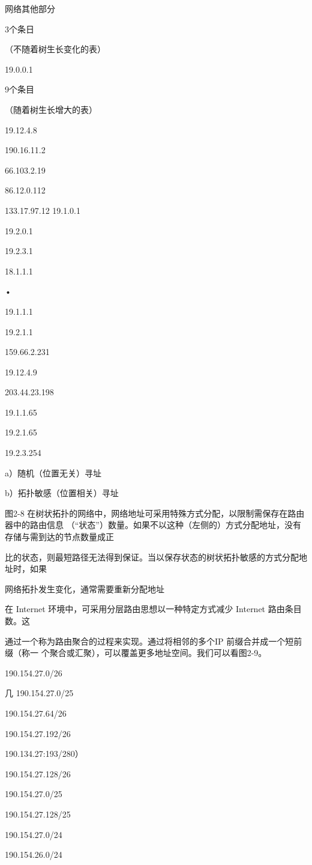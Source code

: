 网络其他部分

3个条日

（不随着树生长变化的表）

19.0.0.1

9个条目

（随着树生长增大的表）

19.12.4.8

190.16.11.2

66.103.2.19

86.12.0.112

133.17.97.12 19.1.0.1

19.2.0.1

19.2.3.1

18.1.1.1

•

19.1.1.1

19.2.1.1

159.66.2.231

19.12.4.9

203.44.23.198

19.1.1.65

19.2.1.65

19.2.3.254

a）随机（位置无关）寻址

b）拓扑敏感（位置相关）寻址

图2-8 在树状拓扑的网络中，网络地址可采用特殊方式分配，以限制需保存在路由器中的路由信息
（“状态”）数量。如果不以这种（左侧的）方式分配地址，没有存储与需到达的节点数量成正

比的状态，则最短路径无法得到保证。当以保存状态的树状拓扑敏感的方式分配地址时，如果

网络拓扑发生变化，通常需要重新分配地址

在 Internet 环境中，可采用分层路由思想以一种特定方式减少 Internet 路由条目数。这

通过一个称为路由聚合的过程来实现。通过将相邻的多个IP 前缀合并成一个短前缀（称一
个聚合或汇聚），可以覆盖更多地址空间。我们可以看图2-9。

190.154.27.0/26

几 190.154.27.0/25

190.154.27.64/26

190.154.27.192/26

190.134.27:193/280）

190.154.27.128/26

190.154.27.0/25

190.154.27.128/25

190.154.27.0/24

190.154.26.0/24

